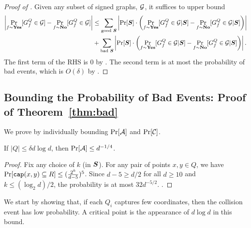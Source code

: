 \begin{proof}[Proof of ]
	Given any subset of signed graphs, ${\cal G}$, it suffices to upper bound
	\begin{align*}
	\left|\Pr_{f\sim \mathbf{Yes}} [G^Q_f \in {\cal G}] - \Pr_{f\sim \mathbf {No}} [G^Q_f \in {\cal G}]\right|  
	&\leq 
    \sum_{\textrm{good } \boldsymbol{S}} \left|\Pr[\boldsymbol{S}]\cdot\left(\Pr_{f\sim \mathbf{Yes}} [G^Q_f \in {\cal G} | \boldsymbol{S}] - \Pr_{f\sim \mathbf {No}} [G^Q_f \in {\cal G}|\boldsymbol{S}]\right) \right| \\
    & +  \sum_{\textrm{bad } \boldsymbol{S}} \left|\Pr[\boldsymbol{S}]\cdot\left(\Pr_{f\sim \mathbf{Yes}} [G^Q_f \in {\cal G}|\boldsymbol{S}] - \Pr_{f\sim \mathbf {No}} [G^Q_f \in {\cal G}|\boldsymbol{S}]\right) \right|.
	\end{align*}
	The first term of the RHS is $0$ by .
    The second term is at most the probability of bad events, which is $O(\delta)$
    by .
\end{proof}

\subsection{Bounding the Probability of Bad Events: Proof of Theorem~\ref{thm:bad}}\label{sec:bad}

We prove  by individually bounding $\Pr[{\cal A}]$ and $\Pr[{\cal C}]$.

\begin{lemma}\label{lem:A}
	If $|Q|\leq \delta d\log d$, then $\Pr[{\cal A}] \leq d^{-1/4}$.
\end{lemma}

\begin{proof} Fix any choice of $k$ (in $\boldsymbol{S}$).
For any pair of points $x,y \in Q$, we have $\Pr[\mathtt{cap}(x,y) \subseteq R] \leq (\frac{2^k}{d-5})^5$.  Since $d-5 \geq d/2$ for all $d \geq 10$ and $k \leq (\log_2d)/2$, the probability is at most $32d^{-5/2}$.
.
\end{proof}

\noindent 
{}
We start by showing that, if each $Q_i$ captures
few coordinates, then the collision event has low probability. A critical point is the appearance of $d\log d$ in this bound.

